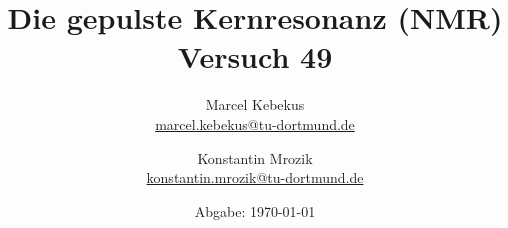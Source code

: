

\title{Die gepulste Kernresonanz (NMR)\\
\small{Versuch 49}
}
\author{%
  Marcel Kebekus\\%
  \href{mailto:marcel.kebekus@tu-dortmund.de}{marcel.kebekus@tu-dortmund.de} \and
  Konstantin Mrozik\\
  \href{mailto:konstantin.mrozik@tu-dortmund.de}{konstantin.mrozik@tu-dortmund.de}%
}
\date{
  Abgabe: \today %
}
\publishers{TU Dortmund – Fakultät Physik}
\makeatletter         
\def\@maketitle{
\raggedright
\texttt{[image: bilder/lo\_TU-Do\_2008/logo\_rgb\_jpg/tud\_logo\_rgb.jpg]}\\[8ex]
\begin{center}
{\Huge \bfseries \sffamily \@title }\\[4ex] 
{\Large  \@author}\\[4ex] 
\@date\\[8ex]
\publishers\\
\end{center}}
\makeatother





\maketitle
\thispagestyle{empty}
\tableofcontents
\newpage




\newpage
\nocite{*}
\printbibliography
%




